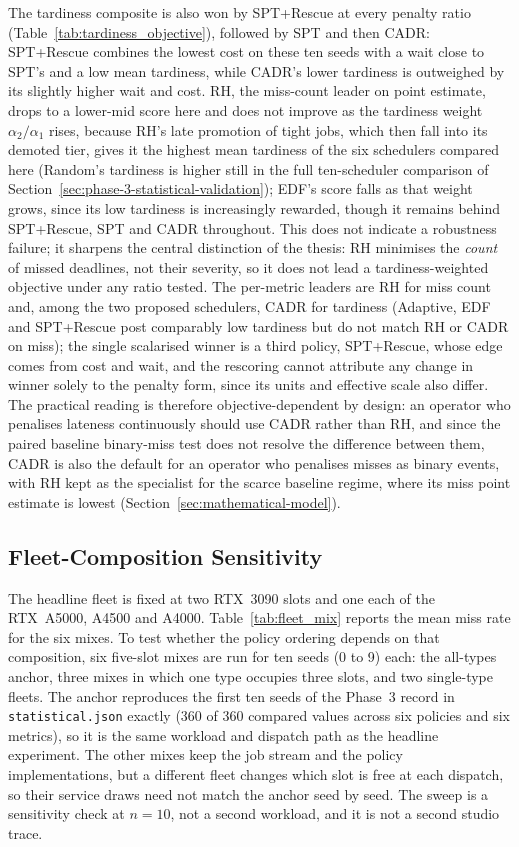 {The tardiness composite is also won by SPT+Rescue at every penalty ratio (Table~\ref{tab:tardiness_objective}), followed by SPT and then CADR: SPT+Rescue combines the lowest cost on these ten seeds with a wait close to SPT's and a low mean tardiness, while CADR's lower tardiness is outweighed by its slightly higher wait and cost. RH, the miss-count leader on point estimate, drops to a lower-mid score here and does not improve as the tardiness weight $\alpha_2/\alpha_1$ rises, because RH's late promotion of tight jobs, which then fall into its demoted tier, gives it the highest mean tardiness of the six schedulers compared here (Random's tardiness is higher still in the full ten-scheduler comparison of Section~\ref{sec:phase-3-statistical-validation}); EDF's score falls as that weight grows, since its low tardiness is increasingly rewarded, though it remains behind SPT+Rescue, SPT and CADR throughout. This does not indicate a robustness failure; it sharpens the central distinction of the thesis: RH minimises the \emph{count} of missed deadlines, not their severity, so it does not lead a tardiness-weighted objective under any ratio tested. The per-metric leaders are RH for miss count and, among the two proposed schedulers, CADR for tardiness (Adaptive, EDF and SPT+Rescue post comparably low tardiness but do not match RH or CADR on miss); the single scalarised winner is a third policy, SPT+Rescue, whose edge comes from cost and wait, and the rescoring cannot attribute any change in winner solely to the penalty form, since its units and effective scale also differ. The practical reading is therefore objective-dependent by design: an operator who penalises lateness continuously should use CADR rather than RH, and since the paired baseline binary-miss test does not resolve the difference between them, CADR is also the default for an operator who penalises misses as binary events, with RH kept as the specialist for the scarce baseline regime, where its miss point estimate is lowest (Section~\ref{sec:mathematical-model}).

\subsection{Fleet-Composition Sensitivity}
\label{ssec:fleet-composition-sensitivity}

The headline fleet is fixed at two RTX~3090 slots and one each of the RTX~A5000, A4500 and A4000. Table~\ref{tab:fleet_mix} reports the mean miss rate for the six mixes. To test whether the policy ordering depends on that composition, six five-slot mixes are run for ten seeds (0 to 9) each: the all-types anchor, three mixes in which one type occupies three slots, and two single-type fleets. The anchor reproduces the first ten seeds of the Phase~3 record in \texttt{statistical.json} exactly (360 of 360 compared values across six policies and six metrics), so it is the same workload and dispatch path as the headline experiment. The other mixes keep the job stream and the policy implementations, but a different fleet changes which slot is free at each dispatch, so their service draws need not match the anchor seed by seed. The sweep is a sensitivity check at $n=10$, not a second workload, and it is not a second studio trace.

}
